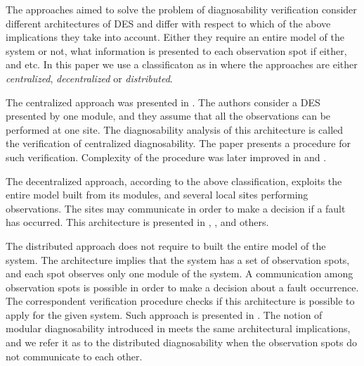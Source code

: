 \documentclass[a4paper, 10pt, conference]{ieeeconf} \IEEEoverridecommandlockouts
\begin{document}
The approaches aimed to solve the problem of diagnosability verification
consider different architectures of DES and differ with respect to which of the
above implications they take into account. Either they require an entire model
of the system or not, what information is presented to each observation spot if
either, and etc. In this paper we use a classificaton as in
\cite{su_global_2005} where the approaches are either \emph{centralized},
\emph{decentralized} or \emph{distributed}.

The centralized approach was presented in \cite{sampath_diagnosability_1995}.
The authors consider a DES presented by one module, and they assume that all the
observations can be performed at one site. The diagnosability analysis of this
architecture is called the verification of centralized diagnosability. The paper
presents a procedure for such verification. Complexity of the procedure was
later improved in \cite{jiang_polynomial_2001} and
\cite{yoo_polynomial-time_2002}.

The decentralized approach, according to the above classification, exploits the
entire model built from its modules, and several local sites performing
observations. The sites may communicate in order to make a decision if a fault
has occurred. This architecture is presented in \cite{debouk_coordinated_1998},
\cite{qiu_decentralized_2006}, \cite{wang_diagnosis_2007} and others.

The distributed approach does not require to built the entire model of the
system. The architecture implies that the system has a set of observation spots,
and each spot observes only one module of the system. A communication among
observation spots is possible in order to make a decision about a fault
occurrence. The correspondent verification procedure checks if this architecture
is possible to apply for the given system. Such approach is presented in
\cite{su_distributed_2002}. The notion of modular diagnosability introduced in
\cite{contant_diagnosability_2006} meets the same architectural implications,
and we refer it as to the distributed diagnosability when the observation spots
do not communicate to each other.

\end{document}
